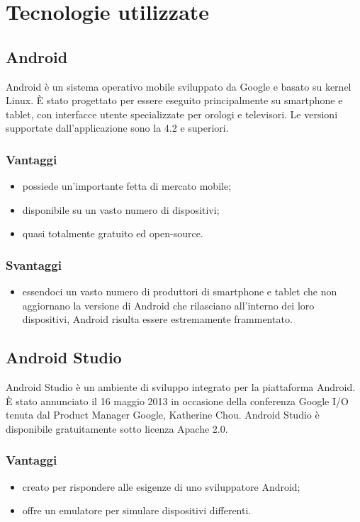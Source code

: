 \documentclass[../Tesi.tex]{subfiles}
\begin{document}
\section{Tecnologie utilizzate}
	
	\subsection{Android}
		Android è un sistema operativo mobile sviluppato da Google e basato su kernel Linux. È stato progettato per essere eseguito principalmente su smartphone e tablet, con interfacce utente specializzate per orologi e televisori. Le versioni supportate dall'applicazione sono la 4.2 e superiori.
		\subsubsection{Vantaggi}
			\begin{itemize}
				\item possiede un'importante fetta di mercato mobile;
				\item disponibile su un vasto numero di dispositivi;
				\item quasi totalmente gratuito ed open-source.
			\end{itemize}
		\subsubsection{Svantaggi}
			\begin{itemize}
				\item essendoci un vasto numero di produttori di smartphone e tablet che non aggiornano la versione di Android che rilasciano all'interno dei loro dispositivi, Android risulta essere estremamente frammentato.
			\end{itemize}
	
	\subsection{Android Studio}
	Android Studio è un ambiente di sviluppo integrato per la piattaforma Android. È stato annunciato il 16 maggio 2013 in occasione della conferenza Google I/O tenuta dal Product Manager Google, Katherine Chou. Android Studio è disponibile gratuitamente sotto licenza Apache 2.0.
		\subsubsection{Vantaggi}
			\begin{itemize}
				\item creato per rispondere alle esigenze di uno sviluppatore Android;
				\item offre un emulatore per simulare dispositivi differenti.
			\end{itemize}
\end{document}
